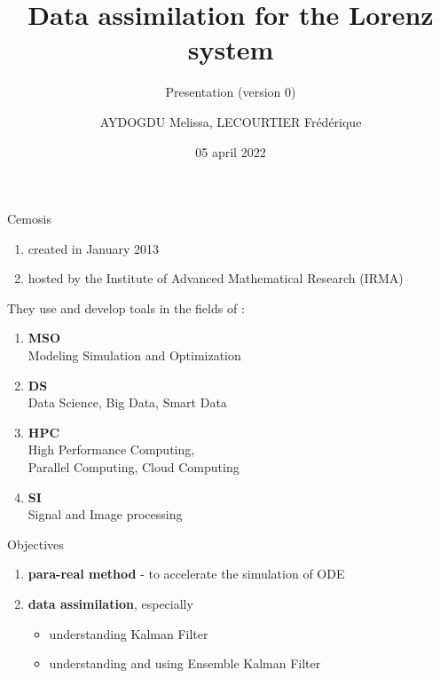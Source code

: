 \documentclass[10pt,xcolor={table,dvipsnames},t]{beamer}
\title[Lorenz]{Data assimilation for the Lorenz system}
\subtitle{Presentation (version 0)}
\author[name]{AYDOGDU Melissa, LECOURTIER Frédérique}
\institute{\large Strasbourg University}
\date{05 april 2022}
\begin{document}
	
	\begin{frame}
		\titlepage
	\end{frame}
	
	\AtBeginSection[]{
		\begin{frame}
			\vfill
			\centering
			\begin{beamercolorbox}[sep=5pt,shadow=true,rounded=true]{subtitle}
				\usebeamerfont{title}\insertsectionhead\par%
			\end{beamercolorbox}
			\vfill
		\end{frame}
	}



	\begin{frame}{Cemosis}
		
		\begin{minipage}{0.4\hsize}
			\centering
			\begin{enumerate}[$\rightarrow$]
				\item created in January 2013
				\item hosted by the Institute of Advanced Mathematical Research (IRMA)
			\end{enumerate}
		\end{minipage} \quad
		\begin{minipage}{0.5\hsize}
			They use and develop toals in the fields of : 
			\begin{enumerate}[\textbullet]
				\item \textbf{MSO} \\
				Modeling Simulation and Optimization
				\item \textbf{DS} \\
				Data Science, Big Data, Smart Data
				\item \textbf{HPC} \\
				High Performance Computing, \\
				Parallel Computing, Cloud Computing
				\item \textbf{SI} \\
				Signal and Image processing
			\end{enumerate}
		\end{minipage}
	
	\end{frame}

	\begin{frame}{Objectives}
		
		 \begin{enumerate}[\textbullet]
			\item \textbf{para-real method} - \quad to accelerate the simulation of ODE
			\item \textbf{data assimilation}, especially
			\begin{itemize}
				\item understanding Kalman Filter
				\item understanding and using Ensemble Kalman Filter
			\end{itemize}
		\end{enumerate}	 	
		
	\end{frame}
	
\end{document}
